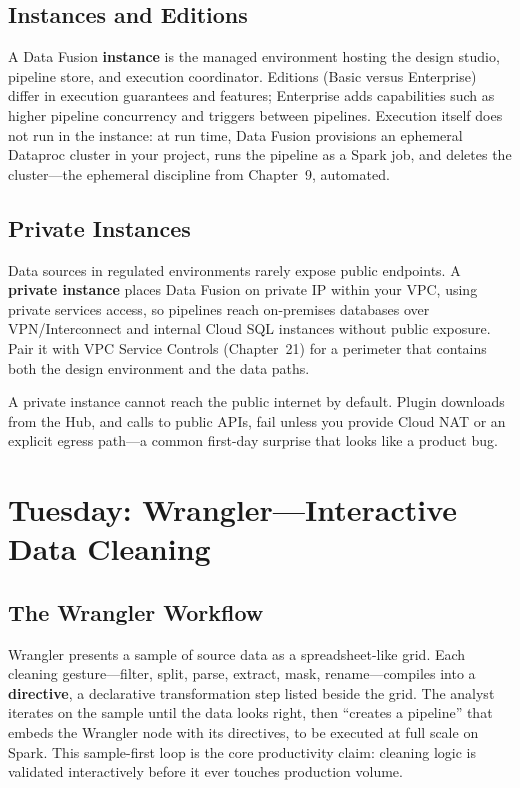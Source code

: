 \subsection{Instances and Editions}
A Data Fusion \textbf{instance} is the managed environment hosting the design studio, pipeline store, and execution coordinator. Editions (Basic versus Enterprise) differ in execution guarantees and features; Enterprise adds capabilities such as higher pipeline concurrency and triggers between pipelines. Execution itself does not run in the instance: at run time, Data Fusion provisions an ephemeral Dataproc cluster in your project, runs the pipeline as a Spark job, and deletes the cluster---the ephemeral discipline from Chapter~9, automated.

\subsection{Private Instances}
Data sources in regulated environments rarely expose public endpoints. A \textbf{private instance} places Data Fusion on private IP within your VPC, using private services access, so pipelines reach on-premises databases over VPN/Interconnect and internal Cloud SQL instances without public exposure. Pair it with VPC Service Controls (Chapter~21) for a perimeter that contains both the design environment and the data paths.

\begin{pitfall}
A private instance cannot reach the public internet by default. Plugin downloads from the Hub, and calls to public APIs, fail unless you provide Cloud NAT or an explicit egress path---a common first-day surprise that looks like a product bug.
\end{pitfall}

\section{Tuesday: Wrangler---Interactive Data Cleaning}

\subsection{The Wrangler Workflow}
Wrangler presents a sample of source data as a spreadsheet-like grid. Each cleaning gesture---filter, split, parse, extract, mask, rename---compiles into a \textbf{directive}, a declarative transformation step listed beside the grid. The analyst iterates on the sample until the data looks right, then ``creates a pipeline'' that embeds the Wrangler node with its directives, to be executed at full scale on Spark. This sample-first loop is the core productivity claim: cleaning logic is validated interactively before it ever touches production volume.

